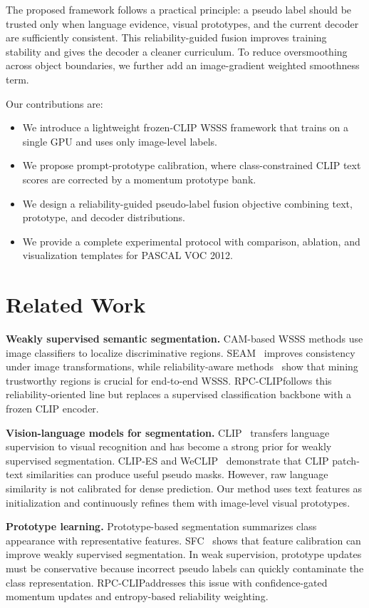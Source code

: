 \documentclass[letterpaper]{article}
\newcommand{\method}{RPC-CLIP}
\begin{document}
The proposed framework follows a practical principle: a pseudo label should be
trusted only when language evidence, visual prototypes, and the current decoder
are sufficiently consistent. This reliability-guided fusion improves training
stability and gives the decoder a cleaner curriculum. To reduce oversmoothing
across object boundaries, we further add an image-gradient weighted smoothness
term.

Our contributions are:
\begin{itemize}
  \item We introduce a lightweight frozen-CLIP WSSS framework that trains on a
  single GPU and uses only image-level labels.
  \item We propose prompt-prototype calibration, where class-constrained CLIP
  text scores are corrected by a momentum prototype bank.
  \item We design a reliability-guided pseudo-label fusion objective combining
  text, prototype, and decoder distributions.
  \item We provide a complete experimental protocol with comparison, ablation,
  and visualization templates for PASCAL VOC 2012.
\end{itemize}

\section{Related Work}
\textbf{Weakly supervised semantic segmentation.}
CAM-based WSSS methods use image classifiers to localize discriminative regions.
SEAM~\cite{wang2020seam} improves consistency under image transformations,
while reliability-aware methods~\cite{zhang2021rrm,zhang2021a2gnn} show that
mining trustworthy regions is crucial for end-to-end WSSS. \method follows this
reliability-oriented line but replaces a supervised classification backbone with
a frozen CLIP encoder.

\textbf{Vision-language models for segmentation.}
CLIP~\cite{radford2021clip} transfers language supervision to visual recognition
and has become a strong prior for weakly supervised segmentation. CLIP-ES and
WeCLIP~\cite{lin2023clipes,zhang2024weclip} demonstrate that CLIP patch-text
similarities can produce useful pseudo masks. However, raw language similarity
is not calibrated for dense prediction. Our method uses text features as
initialization and continuously refines them with image-level visual prototypes.

\textbf{Prototype learning.}
Prototype-based segmentation summarizes class appearance with representative
features. SFC~\cite{xu2024sfc} shows that feature calibration can improve weakly
supervised segmentation. In weak supervision, prototype updates must be
conservative because incorrect pseudo labels can quickly contaminate the class
representation. \method addresses this issue with confidence-gated momentum
updates and entropy-based reliability weighting.
\end{document}
